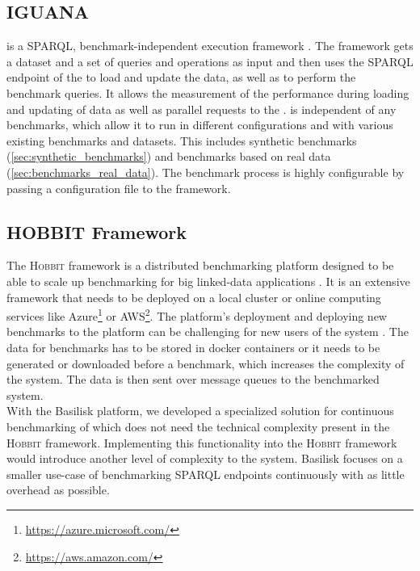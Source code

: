 \subsection{IGUANA}
\label{sec:iguana}
\iguana{} is a SPARQL, benchmark-independent execution framework \cite{conradsIguanaGenericFramework2017}.
The framework gets a dataset and a set of queries and operations as input and then uses the SPARQL endpoint of the \ts{} to load and update the data, as well as to perform the benchmark queries.
It allows the measurement of the performance during loading and updating of data as well as parallel requests to the \ts{}.
\iguana{} is independent of any benchmarks, which allow it to run in different configurations and with various existing benchmarks and datasets.
This includes synthetic benchmarks (\ref{sec:synthetic_benchmarks}) and benchmarks based on real data (\ref{sec:benchmarks_real_data}).
The benchmark process is highly configurable by passing a configuration file to the \iguana{} framework.


\subsection{HOBBIT Framework}
The \textsc{Hobbit} framework is a distributed benchmarking platform designed to be able to scale up benchmarking for big linked-data applications \cite{roderHOBBITPlatformBenchmarking}.
It is an extensive framework that needs to be deployed on a local cluster or online computing services like Azure\footnote{\url{https://azure.microsoft.com/}} or AWS\footnote{\url{https://aws.amazon.com/}}.
The platform's deployment and deploying new benchmarks to the platform can be challenging for new users of the system \cite{roderHOBBITPlatformBenchmarking}.
The data for benchmarks has to be stored in docker containers or it needs to be generated or downloaded before a benchmark, which increases the complexity of the system.
The data is then sent over message queues to the benchmarked system.
\\

With the Basilisk platform, we developed a specialized solution for continuous benchmarking of \tsp{} which does not need the technical complexity present in the \textsc{Hobbit} framework.
Implementing this functionality into the \textsc{Hobbit} framework would introduce another level of complexity to the system.
Basilisk focuses on a smaller use-case of benchmarking SPARQL endpoints continuously with as little overhead as possible.

